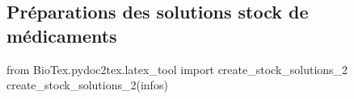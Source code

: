 \subsection{Préparations des solutions stock de médicaments}

\begin{pycode}
from BioTex.pydoc2tex.latex_tool import create_stock_solutions_2
create_stock_solutions_2(infos)
\end{pycode}

